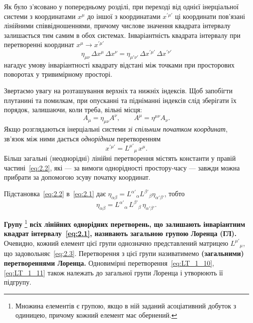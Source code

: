 \documentclass[%
biblatex,
]{ConspectBook}
\begin{document}
Як було з'ясовано у попередньому розділі, при переході від однієї
інерціальної системи з координатами $x^\mu$ до іншої з координатами
$x^{\prime\mu'}$ ці координати пов'язані лінійними співвідношеннями, причому
числове значення квадрата інтервалу залишається тим самим в обох системах.
Інваріантність квадрата інтервалу при перетворенні координат
$x^\mu \to x^{\prime\mu'}$
\begin{equation}
  \eta_{\mu\nu}\,\Delta x^\mu\,\Delta x^\nu
  = \eta_{\mu'\nu'}\,\Delta x^{\prime\mu'}\,\Delta x^{\prime\nu'}
  \label{eq:2.1}
\end{equation}
нагадує умову інваріантності квадрату відстані між точками при просторових
поворотах у тривимірному просторі.


Звертаємо увагу на розташування верхніх та нижніх індексів. Щоб запобігти
плутанині та помилкам, при опусканні та підніманні індексів слід зберігати
їх порядок, залишаючи, коли треба, вільні місця:
\[
  A_\mu = \eta_{\mu\nu} A^\nu, \qquad
  A^\mu = \eta^{\mu\nu} A_\nu.
\]
Якщо розглядаються інерціальні системи \textit{зі спільним початком координат},
зв'язок між ними дається \textit{однорідним} перетворенням
\begin{equation}
  x^{\prime\mu'} = L^{\mu'}{}_\mu\, x^\mu.
  \label{eq:2.2}
\end{equation}
Більш загальні (неоднорідні) лінійні перетворення містять константи у
правій частині~\eqref{eq:2.2}, які --- за вимоги однорідності простору-часу
--- завжди можна прибрати за допомогою зсуву початку координат.

Підстановка~\eqref{eq:2.2} в~\eqref{eq:2.1} дає
$\eta_{\alpha\beta} = L^{\alpha'}{}_\alpha L^{\beta'}{}_\beta \eta_{\alpha'\beta'}$,
тобто
\begin{equation}
  \eta_{\alpha\beta} = L^{\alpha'}{}_\alpha\, L^{\beta'}{}_\beta\, \eta_{\alpha'\beta'}.
  \label{eq:2.3}
\end{equation}

\textbf{Групу}%
\footnote{Множина елементів є групою, якщо в ній заданий асоціативний
добуток з одиницею, причому кожний елемент має обернений.}
\textbf{всіх лінійних однорідних перетворень, що залишають інваріантним
квадрат інтервалу~\eqref{eq:2.1}, називають загальною групою Лоренца (ГЛ).}
Очевидно, кожний елемент цієї групи однозначно представлений матрицею
$L^{\mu'}{}_\mu$, що задовольняє~\eqref{eq:2.3}.
Перетворення з цієї групи називатимемо \textbf{(загальними) перетвореннями
Лоренца.} Одновимірні перетворення~\eqref{eq:LT_1_10}, \eqref{eq:LT_1_11} також належать до
загальної групи Лоренца і утворюють її підгрупу.
\end{document}
